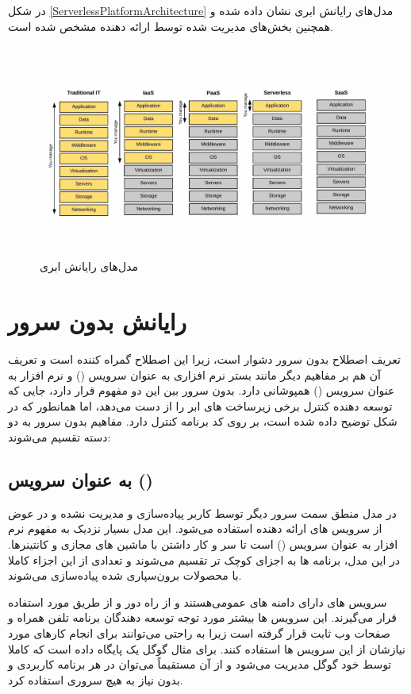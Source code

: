 در شکل \ref{ServerlessPlatformArchitecture} مدل‌های رایانش ابری نشان داده شده و همچنین بخش‌های مدیریت شده توسط ارائه دهنده مشخص شده‌ است.

\begin{figure}[!h]
	\centering
	\includegraphics[height=7cm]{images/cloud-computing-service-models}
	\caption{مدل‌های رایانش ابری}
	\label{cloudComputingServiceModels}
\end{figure}

\newpage

\section{رایانش بدون سرور}

تعریف اصطلاح بدون سرور دشوار است، زیرا این اصطلاح گمراه کننده است و تعریف آن هم بر مفاهیم دیگر مانند بستر نرم افزاری به عنوان سرویس () و نرم افزار به عنوان سرویس () همپوشانی دارد. بدون سرور بین این دو مفهوم قرار دارد، جایی که توسعه دهنده کنترل برخی زیرساخت های ابر را از دست می‌دهد، اما همانطور که در شکل  توضیح داده شده است، بر روی کد برنامه کنترل دارد. مفاهیم بدون سرور به دو دسته تقسیم می‌شوند:

\subsection{ به عنوان سرویس ()}

در مدل  منطق سمت سرور دیگر توسط کاربر پیاده‌سازی و مدیریت نشده و در عوض از سرویس های ارائه دهنده استفاده می‌شود. این مدل بسیار نزدیک به مفهوم نرم افزار به عنوان سرویس () است تا سر و کار داشتن با ماشین های مجازی و کانتینرها. در این مدل، برنامه ها به اجزای کوچک تر تقسیم می‌شوند و تعدادی از این اجزاء کاملا با محصولات برون‌سپاری شده پیاده‌سازی می‌شوند.

سرویس های  دارای دامنه های عمومی‌هستند و از راه دور و از طریق  مورد استفاده قرار می‌گیرند. این سرویس ها بیشتر مورد توجه توسعه دهندگان برنامه تلفن همراه و صفحات وب ثابت قرار گرفته است زیرا به راحتی می‌توانند برای انجام کارهای مورد نیازشان از این سرویس ها استفاده کنند. برای مثال  گوگل یک پایگاه داده است که کاملا توسط خود گوگل مدیریت می‌شود و از آن مستقیماً می‌توان در هر برنامه کاربردی و بدون نیاز به هیچ سروری استفاده کرد.

